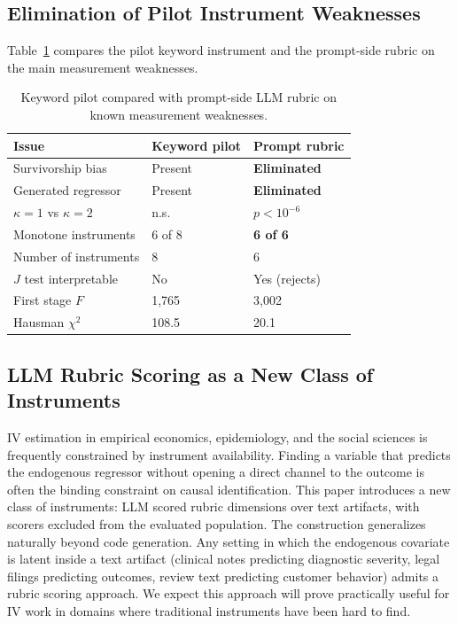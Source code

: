 \documentclass{article}
\begin{document}
\subsection{Elimination of Pilot Instrument Weaknesses}

Table~\ref{tab:b-vs-c} compares the pilot keyword instrument and the prompt-side rubric on the main measurement weaknesses.

\begin{table}[h]
\centering
\caption{Keyword pilot compared with prompt-side LLM rubric on known measurement weaknesses.}
\label{tab:b-vs-c}
\begin{tabular}{@{}lll@{}}
\toprule
Issue & Keyword pilot & Prompt rubric \\
\midrule
Survivorship bias        & Present & \textbf{Eliminated} \\
Generated regressor      & Present & \textbf{Eliminated} \\
$\kappa=1$ vs $\kappa=2$ & n.s.    & $p<10^{-6}$ \\
Monotone instruments     & 6 of 8  & \textbf{6 of 6} \\
Number of instruments    & 8       & 6 \\
$J$ test interpretable   & No      & Yes (rejects) \\
First stage $F$          & 1{,}765 & 3{,}002 \\
Hausman $\chi^2$         & 108.5   & 20.1 \\
\bottomrule
\end{tabular}
\end{table}

\subsection{LLM Rubric Scoring as a New Class of Instruments}

IV estimation in empirical economics, epidemiology, and the social sciences is frequently constrained by instrument availability. Finding a variable that predicts the endogenous regressor without opening a direct channel to the outcome is often the binding constraint on causal identification. This paper introduces a new class of instruments: LLM scored rubric dimensions over text artifacts, with scorers excluded from the evaluated population. The construction generalizes naturally beyond code generation. Any setting in which the endogenous covariate is latent inside a text artifact (clinical notes predicting diagnostic severity, legal filings predicting outcomes, review text predicting customer behavior) admits a rubric scoring approach. We expect this approach will prove practically useful for IV work in domains where traditional instruments have been hard to find.
\end{document}
